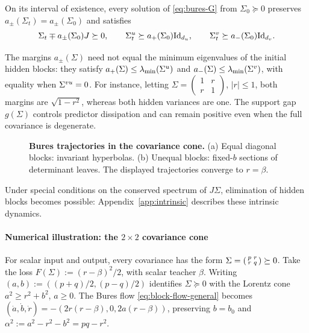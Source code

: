 \begin{proposition}\label{lem:margins}
On its interval of existence, every solution of \eqref{eq:bures-G} from
$\Sigma_0\succeq0$ preserves $a_\pm(\Sigma_t)=a_\pm(\Sigma_0)$ and satisfies
\[
  \Sigma_t \mp a_{\pm}(\Sigma_0) J \succeq 0, \qquad
  \Sigma^u_t\succeq a_+(\Sigma_0)\mathrm{Id}_{d_u},\qquad
  \Sigma^v_t\succeq a_-(\Sigma_0)\mathrm{Id}_{d_v}.
\]
\end{proposition}

The margins $a_\pm(\Sigma)$ need not equal the minimum eigenvalues of the initial hidden blocks: they satisfy
$a_+(\Sigma)\le\lambda_{\min}(\Sigma^u)$ and
$a_-(\Sigma)\le\lambda_{\min}(\Sigma^v)$, with equality when $\Sigma^{vu}=0$.
For instance, letting $\Sigma=\left(\begin{smallmatrix}1&r\\r&1\end{smallmatrix}\right)$,
$|r|\le1$, both margins are $\sqrt{1-r^2}$, whereas both hidden variances are one.
The support gap $g(\Sigma)$ controls predictor dissipation and can remain positive even when the full covariance is degenerate.
\begin{figure}
  \centering
  \resizebox{\linewidth}{!}{}
  \captionsetup{font=small}
  \caption{\textbf{Bures trajectories in the covariance cone.}
  (a) Equal diagonal blocks: invariant hyperbolas.
  (b) Unequal blocks: fixed-\(b\) sections of determinant leaves.
  The displayed trajectories converge to \(r=\beta\).}
  \label{fig:gaussian-w2-cone-geometry}
\end{figure}
Under special conditions on the conserved spectrum of $J\Sigma$, elimination of hidden blocks becomes possible: Appendix~\ref{app:intrinsic} describes these intrinsic dynamics.

\paragraph{Numerical illustration: the $2\times2$ covariance cone}
For scalar input and output, every covariance has the form
$\Sigma=\begin{psmallmatrix}p&r\\r&q\end{psmallmatrix}\succeq0$.
Take the loss $F(\Sigma):=(r-\beta)^2/2$, with scalar teacher $\beta$.
Writing $(a,b):=((p+q)/2,(p-q)/2)$ identifies $\Sigma\succeq0$ with
the Lorentz cone $a^2\ge r^2+b^2$, $a\ge0$. The Bures flow
\eqref{eq:block-flow-general} becomes
$(\dot a,\dot b,\dot r)=-(2r(r-\beta),0,2a(r-\beta))$,
preserving $b=b_0$ and $\alpha^2:=a^2-r^2-b^2=pq-r^2$.

